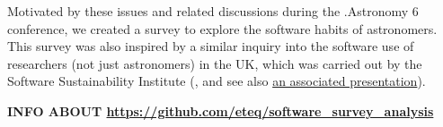 Motivated by these issues and related discussions during the .Astronomy 6 conference, we created a survey to explore the software habits of astronomers. 
This survey was also inspired by a similar inquiry into the software use of researchers (not just astronomers) in the UK, which was carried out by the Software Sustainability Institute (\citealt{f824cd98-b953-4c08-96c8-2533188bc4c4}, and see also \href{http://wl.figshare.com/articles/1243288/embed?show_title=1}{an associated presentation}). %




\textbf{INFO ABOUT \url{https://github.com/eteq/software_survey_analysis}}